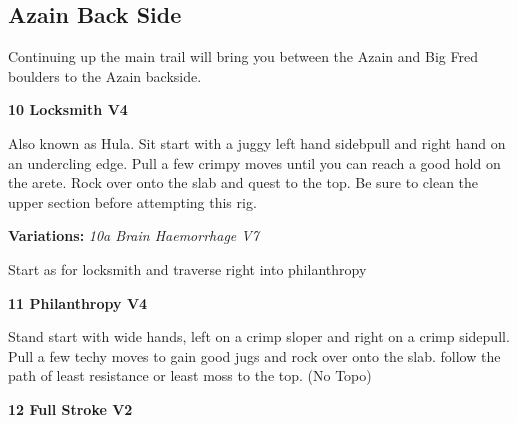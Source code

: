 \begin{multicols*}{2}
			\subsection*{Azain Back Side}\label{bf:Azain Back Side}
			\begin{minipage}{\columnwidth}
			Continuing up the main trail will bring you between the Azain and Big Fred boulders to the Azain backside.
			\end{minipage}
			

					\label{rt:Locksmith}\colorbox{RoyalBlue!20}{\textbf{10 Locksmith V4 \ding{72}    \warn \warn }}
					\begin{adjustwidth}{0.5cm}{}
					\begin{minipage}{\linewidth}					
					Also known as Hula. Sit start with a juggy left hand sidebpull and right hand on an undercling edge. Pull a few crimpy moves until you can reach a good hold on the arete. Rock over onto the slab and quest to the top. Be sure to clean the upper section before attempting this rig.
					\end{minipage}
						\newline \textbf{Variations:} \newline
							\label{vr:Brain Haemorrhage}\colorbox{Goldenrod!50}{\emph{10a Brain Haemorrhage V7  }}
							\begin{adjustwidth}{0.5cm}{}
							\begin{minipage}{\linewidth}					
							Start as for locksmith and traverse right into philanthropy
							\end{minipage}
							\end{adjustwidth}
					\end{adjustwidth}
					\label{rt:Philanthropy}\colorbox{RoyalBlue!20}{\textbf{11 Philanthropy V4   \warn \warn }}
					\begin{adjustwidth}{0.5cm}{}
					\begin{minipage}{\linewidth}					
					Stand start with wide hands, left on a crimp sloper and right on a crimp sidepull. Pull a few techy moves to gain good jugs and rock over onto the slab. follow the path of least resistance or least moss to the top.
						\newline (No Topo) 
					\end{minipage}
					\end{adjustwidth}
					\label{rt:Full Stroke}\colorbox{green!20}{\textbf{12 Full Stroke V2 \ding{72}   \warn }}

\end{multicols*}
